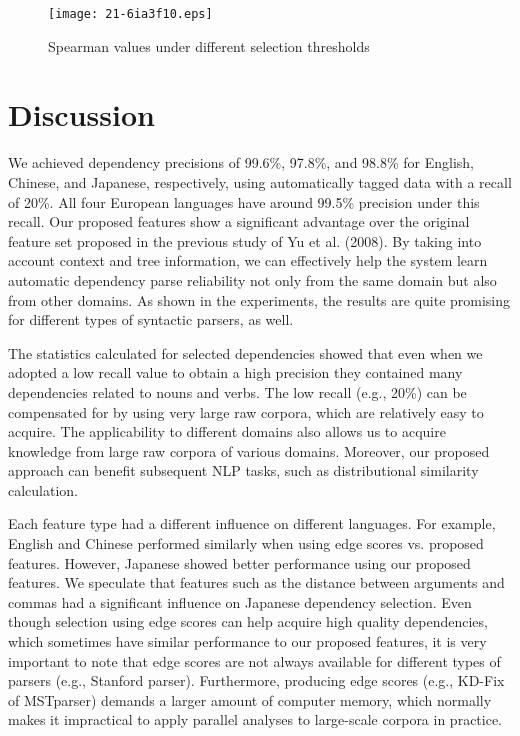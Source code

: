 \documentclass[english]{jnlp_1.4}
\begin{document}
\begin{figure}[t]
\begin{center}
\texttt{[image: 21-6ia3f10.eps]}
\end{center}
\caption{Spearman values under different selection thresholds}
\end{figure}


\section{Discussion}
\label{discuss}

We achieved dependency precisions of 99.6\%, 97.8\%, and 98.8\% for English, 
Chinese, and Japanese, respectively, using automatically tagged data with a recall of 20\%.
All four European languages have around 99.5\% precision under this recall.
Our proposed features show a significant advantage over the original feature set proposed in the
previous study of Yu et al. (2008). By taking into account context and tree information, we can
effectively help the system learn automatic dependency parse reliability not only from the same domain but also from other domains. 
As shown in the experiments, the results are quite promising for different types of syntactic parsers, as well.

The statistics calculated for selected dependencies showed that even when we adopted a
low recall value to obtain a high precision they contained many dependencies related to
nouns and verbs. The low recall (e.g., 20\%) can be compensated for by using very large raw
corpora, which are relatively easy to acquire. The applicability to different domains also allows us to
acquire knowledge from large raw corpora of various domains.
Moreover, our proposed approach can benefit subsequent NLP tasks, such as distributional similarity calculation.

Each feature type had a different influence on different languages. 
For example, English and Chinese performed similarly when using edge scores vs. proposed features.
However, Japanese showed better performance using our proposed features.
We speculate that features such as the distance between arguments and commas had a significant influence on Japanese dependency selection.
Even though selection using edge scores can help acquire high quality dependencies,
which sometimes have similar performance to our proposed features, it is very important to note that edge scores are not always available for different types of parsers (e.g., Stanford parser). 
Furthermore, producing edge scores (e.g., KD-Fix of MSTparser) demands a larger amount of computer memory, which
normally makes it impractical to apply parallel analyses to large-scale corpora in practice.
\end{document}
